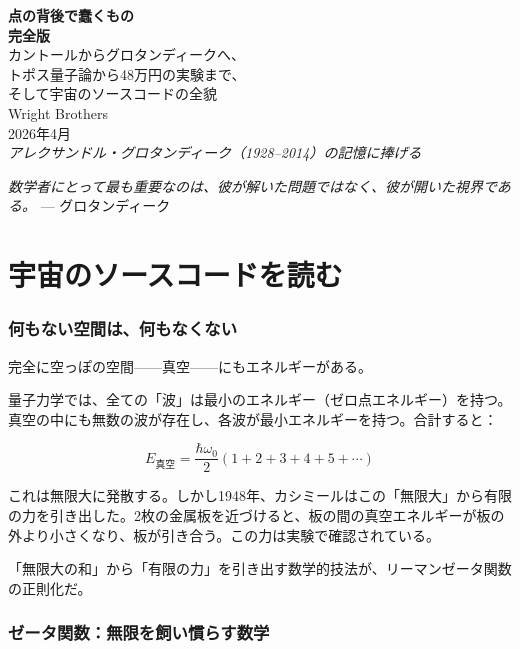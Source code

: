 \documentclass[12pt,a4paper]{article}
\begin{document}
\begin{center}
\vspace*{1cm}
{\Huge\bfseries 点の背後で蠢くもの}\\[0.5cm]
{\Large\bfseries 完全版}\\[0.8cm]
{\large カントールからグロタンディークへ、\\トポス量子論から48万円の実験まで、\\そして宇宙のソースコードの全貌}\\[2cm]
{\large Wright Brothers}\\[0.5cm]
{2026年4月}\\[2cm]
{\itshape アレクサンドル・グロタンディーク（1928--2014）の記憶に捧げる}
\end{center}

\newpage
\tableofcontents
\newpage

\begin{epigraph}
\textit{数学者にとって最も重要なのは、彼が解いた問題ではなく、彼が開いた視界である。}
\hfill --- グロタンディーク
\end{epigraph}

\part{宇宙のソースコードを読む}

\section{何もない空間は、何もなくない}

完全に空っぽの空間——真空——にもエネルギーがある。

量子力学では、全ての「波」は最小のエネルギー（ゼロ点エネルギー）を持つ。真空の中にも無数の波が存在し、各波が最小エネルギーを持つ。合計すると：

$$E_{\text{真空}} = \frac{\hbar\omega_0}{2}(1 + 2 + 3 + 4 + 5 + \cdots)$$

これは無限大に発散する。しかし1948年、カシミールはこの「無限大」から有限の力を引き出した。2枚の金属板を近づけると、板の間の真空エネルギーが板の外より小さくなり、板が引き合う。この力は実験で確認されている。

「無限大の和」から「有限の力」を引き出す数学的技法が、リーマンゼータ関数の正則化だ。

\section{ゼータ関数：無限を飼い慣らす数学}
\end{document}
